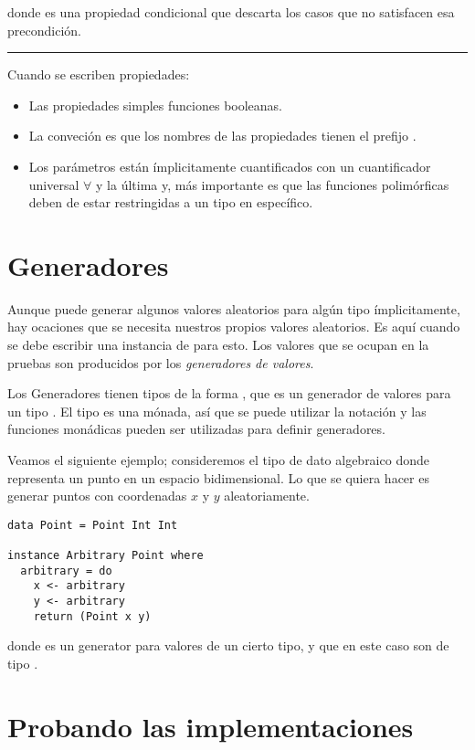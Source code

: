 donde \hsCode{==>} es una propiedad condicional que descarta los casos que no satisfacen esa
precondición.

\noindent\rule{\textwidth}{1pt}

Cuando se escriben propiedades:
\begin{itemize}
\item Las propiedades simples funciones booleanas.
\item La conveción es que los nombres de las propiedades tienen el prefijo .
\item Los parámetros están ímplicitamente cuantificados con un cuantificador universal $\forall$ y
la última y, más importante es que las funciones polimórficas deben de estar restringidas a un tipo
en específico.
\end{itemize}

\section{Generadores}

Aunque \QuickCheck puede generar algunos valores aleatorios para algún tipo ímplicitamente, hay
ocaciones que se necesita nuestros propios valores aleatorios. Es aquí cuando se debe escribir
una instancia de  para esto. Los valores que se ocupan en la pruebas son
producidos por los \textit{generadores de valores}.

Los Generadores tienen tipos de la forma , que es un generador de valores para
un tipo . El tipo  es una mónada, así que se puede utilizar la notación 
 y las funciones monádicas pueden ser utilizadas para definir generadores.

Veamos el siguiente ejemplo; consideremos el tipo de dato algebraico  donde
representa un punto en un espacio bidimensional. Lo que se quiera hacer es generar puntos
con coordenadas $x$ y $y$ aleatoriamente.

\begin{verbatim}
data Point = Point Int Int

instance Arbitrary Point where
  arbitrary = do
    x <- arbitrary
    y <- arbitrary
    return (Point x y)
\end{verbatim}

donde  es un generator para valores de un cierto tipo, y que en este
caso son de tipo .

\section{Probando las implementaciones}

